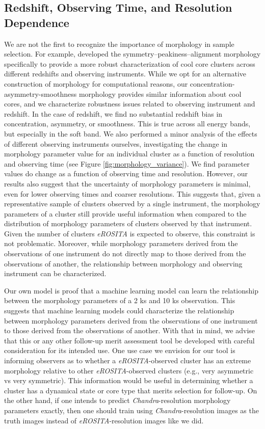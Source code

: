 \subsection{Redshift, Observing Time, and Resolution Dependence}\label{biases}
We are not the first to recognize the importance of morphology in sample selection.  For example, \cite{Mantz_2015} developed the symmetry–peakiness–alignment morphology specifically to provide a more robust characterization of cool core clusters across different redshifts and observing instruments. While we opt for an alternative construction of morphology for computational reasons, our concentration-asymmetry-smoothness morphology provides similar information about cool cores, and we characterize robustness issues related to observing instrument and redshift. In the case of redshift, we find no substantial redshift bias in concentration, asymmetry, or smoothness. This is true across all energy bands, but especially in the soft band. We also performed a minor analysis of the effects of different observing instruments ourselves, investigating the change in morphology parameter value for an individual cluster as a function of resolution and observing time (see Figure \ref{fig:morphology_variance}). We find parameter values do change as a function of observing time and resolution. However, our results also suggest that the uncertainty of morphology parameters is minimal, even for lower observing times and coarser resolutions. This suggests that, given a representative sample of clusters observed by a single instrument, the morphology parameters of a cluster still provide useful information when compared to the distribution of morphology parameters of clusters observed by that instrument. Given the number of clusters \textit{eROSITA} is expected to observe, this constraint is not problematic. Moreover, while morphology parameters derived from the observations of one instrument do not directly map to those derived from the observations of another, the relationship between morphology and observing instrument can be characterized. 

Our own model is proof that a machine learning model can learn the relationship between the morphology parameters of a 2 ks and 10 ks observation. This suggests that machine learning models could characterize the relationship between morphology parameters derived from the observations of one instrument to those derived from the observations of another. With that in mind, we advise that this or any other follow-up merit assessment tool be developed with careful consideration for its intended use. One use case we envision for our tool is informing observers as to whether a \textit{eROSITA}-observed cluster has an extreme morphology relative to other \textit{eROSITA}-observed clusters (e.g., very asymmetric vs very symmetric). This information would be useful in determining whether a cluster has a dynamical state or core type that merits selection for follow-up. On the other hand, if one intends to predict \textit{Chandra}-resolution morphology parameters exactly, then one should train using \textit{Chandra}-resolution images as the truth images instead of \textit{eROSITA}-resolution images like we did.

